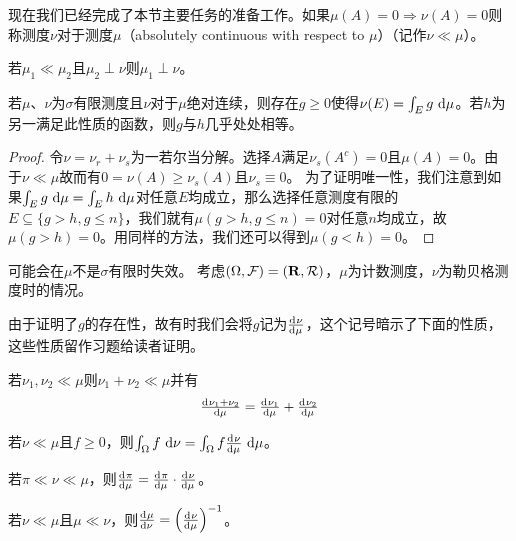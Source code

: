 \documentclass[main.tex]{subfiles}
\begin{document}
现在我们已经完成了本节主要任务的准备工作。如果\(\mu(A)=0\Rightarrow\nu(A)=0\)则称测度\(\nu\)对于测度\(\mu\)（absolutely continuous with respect to \(\mu\)）（记作\(\nu\ll\mu\)）。
\begin{exercise}[start=4]
	\item 若\(\mu_1\ll\mu_2\)且\(\mu_2\perp\nu\)则\(\mu_1\perp\nu\)。
\end{exercise}
\begin{theorem}
	\label{thm:a.4.8}
	若\(\mu\)、\(\nu\)为\(\sigma\)有限测度且\(\nu\)对于\(\mu\)绝对连续，则存在\(g\geq0\)使得\(\nu(E)=\int_Eg\,\dif\mu\)。若\(h\)为另一满足此性质的函数，则\(g\)与\(h\)几乎处处相等。
\end{theorem}
\begin{proof}
	令\(\nu=\nu_r+\nu_s\)为一若尔当分解。选择\(A\)满足\(\nu_s(A^c)=0\)且\(\mu(A)=0\)。由于\(\nu\ll\mu\)故而有\(0=\nu(A)\geq\nu_s(A)\)且\(\nu_s\equiv0\)。
	为了证明唯一性，我们注意到如果\(\int_Eg\,\dif\mu=\int_Eh\,\dif\mu\)对任意\(E\)均成立，那么选择任意测度有限的\(E\subseteq\{g>h,g\leq n\}\)，我们就有\(\mu(g>h,g\leq n)=0\)对任意\(n\)均成立，故\(\mu(g>h)=0\)。用同样的方法，我们还可以得到\(\mu(g<h)=0\)。
\end{proof}
\begin{example}
	可能会在\(\mu\)不是\(\sigma\)有限时失效。
	考虑\((\Omega,\mathcal{F})=(\mathbf{R},\mathcal{R})\)，\(\mu\)为计数测度，\(\nu\)为勒贝格测度时的情况。
\end{example}

由于证明了\(g\)的存在性，故有时我们会将\(g\)记为\(\od{\nu}{\mu}\)，这个记号暗示了下面的性质，这些性质留作习题给读者证明。
\begin{exercise}[start=6]
	\item 若\(\nu_1,\nu_2\ll\mu\)则\(\nu_1+\nu_2\ll\mu\)并有
	\[\od{\nu_1+\nu_2}{\mu}=\od{\nu_1}{\mu}+\od{\nu_2}{\mu}\]
	\item 若\(\nu\ll\mu\)且\(f\geq0\)，则\(\int_\Omega f\,\dif\nu=\int_\Omega f\od{\nu}{\mu}\,\dif\mu\)。
	\item 若\(\pi\ll\nu\ll\mu\)，则\(\od{\pi}{\mu}=\od{\pi}{\mu}\cdot\od{\nu}{\mu}\)。
	\item 若\(\nu\ll\mu\)且\(\mu\ll\nu\)，则\(\od{\mu}{\nu}=\del{\od{\nu}{\mu}}^{-1}\)。
\end{exercise}
\end{document}
